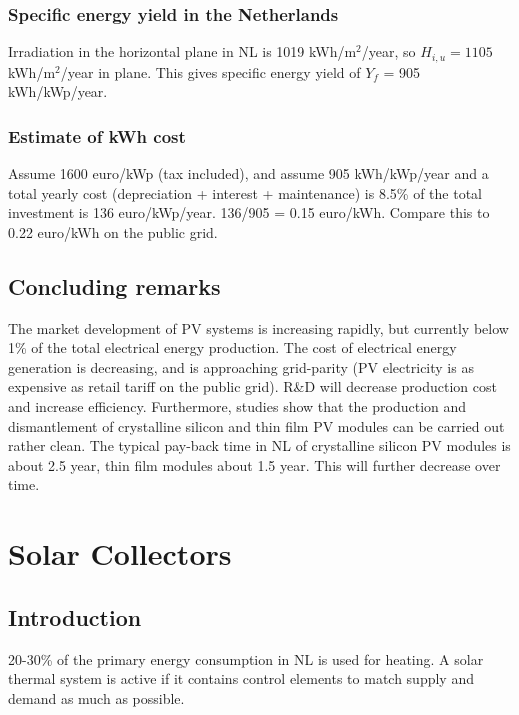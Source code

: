 \documentclass[a4paper,10pt]{article}
\begin{document}
\subsubsection{Specific energy yield in the Netherlands}
Irradiation in the horizontal plane in NL is 1019 kWh/m$^2$/year, so $H_{i,u} = 1105$ kWh/m$^2$/year in plane. This gives specific energy yield of $Y_f$ = 905 kWh/kWp/year.

\subsubsection{Estimate of kWh cost}
Assume 1600 euro/kWp (tax included), and assume 905 kWh/kWp/year and a total yearly cost (depreciation + interest + maintenance) is 8.5\% of the total investment is 136 euro/kWp/year. 136/905 = 0.15 euro/kWh. Compare this to 0.22 euro/kWh on the public grid.

\subsection{Concluding remarks}
The market development of PV systems is increasing rapidly, but currently below 1\% of the total electrical energy production. The cost of electrical energy generation is decreasing, and is approaching grid-parity (PV electricity is as expensive as retail tariff on the public grid). R\&D will decrease production cost and increase efficiency. Furthermore, studies show that the production and dismantlement of crystalline silicon and thin film PV modules can be carried out rather clean. The typical pay-back time in NL of crystalline silicon PV modules is about 2.5 year, thin film modules about 1.5 year. This will further decrease over time.


\section{Solar Collectors}
\subsection{Introduction}
20-30\% of the primary energy consumption in NL is used for heating. A solar thermal system is active if it contains control elements to match supply and demand as much as possible.
\end{document}
